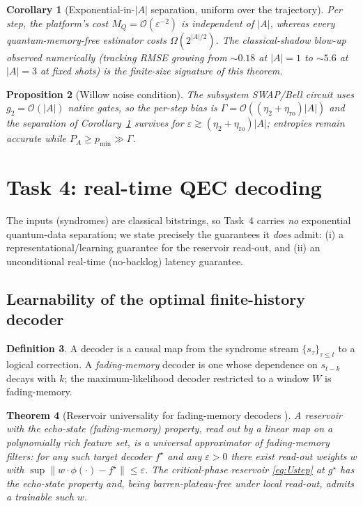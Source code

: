 \documentclass[11pt]{article}
\theoremstyle{plain}
\newtheorem{theorem}{Theorem}[section]
\newtheorem{proposition}[theorem]{Proposition}
\newtheorem{corollary}[theorem]{Corollary}
\theoremstyle{definition}
\newtheorem{definition}[theorem]{Definition}
\theoremstyle{remark}
\newcommand{\eps}{\varepsilon}
\newcommand{\bigO}{\mathcal{O}}
\begin{document}
\begin{corollary}[Exponential-in-$|A|$ separation, uniform over the trajectory]\label{cor:t3}
Per step, the platform's cost $M_Q=\bigO(\eps^{-2})$ is independent of $|A|$, whereas every quantum-memory-free estimator costs $\Omega(2^{|A|/2})$. The classical-shadow blow-up observed numerically (tracking RMSE growing from $\sim0.18$ at $|A|=1$ to $\sim5.6$ at $|A|=3$ at fixed shots) is the finite-size signature of this theorem.
\end{corollary}
\begin{proposition}[Willow noise condition]
The subsystem SWAP/Bell circuit uses $g_2=\bigO(|A|)$ native gates, so the per-step bias is $\Gamma=\bigO((\eta_2+\eta_{\mathrm{ro}})|A|)$ and the separation of Corollary~\ref{cor:t3} survives for $\eps\gtrsim(\eta_2+\eta_{\mathrm{ro}})|A|$; entropies remain accurate while $P_A\ge p_{\min}\gg\Gamma$.
\end{proposition}

\section{Task 4: real-time QEC decoding}\label{sec:task4}

The inputs (syndromes) are classical bitstrings, so Task~4 carries \emph{no} exponential quantum-data separation; we state precisely the guarantees it \emph{does} admit: (i) a representational/learning guarantee for the reservoir read-out, and (ii) an unconditional real-time (no-backlog) latency guarantee.

\subsection{Learnability of the optimal finite-history decoder}
\begin{definition}
A decoder is a causal map from the syndrome stream $\{s_\tau\}_{\tau\le t}$ to a logical correction. A \emph{fading-memory} decoder is one whose dependence on $s_{t-k}$ decays with $k$; the maximum-likelihood decoder restricted to a window $W$ is fading-memory.
\end{definition}

\begin{theorem}[Reservoir universality for fading-memory decoders \cite{GO,BoydChua}]\label{thm:t4univ}
A reservoir with the echo-state (fading-memory) property, read out by a linear map on a polynomially rich feature set, is a universal approximator of fading-memory filters: for any such target decoder $f^\star$ and any $\eps>0$ there exist read-out weights $w$ with $\sup\|w\!\cdot\!\phi(\cdot)-f^\star\|\le\eps$. The critical-phase reservoir \eqref{eq:Ustep} at $g^\star$ has the echo-state property and, being barren-plateau-free under local read-out, admits a trainable such $w$.
\end{theorem}
\end{document}
